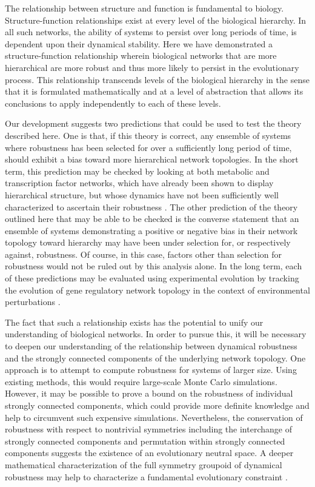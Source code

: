 The relationship between structure and function is fundamental to biology. Structure-function relationships exist at every level of the biological hierarchy. In all such networks, the ability of systems to persist over long periods of time, is dependent upon their dynamical stability. Here we have demonstrated a structure-function relationship wherein biological networks that are more hierarchical are more robust and thus more likely to persist in the evolutionary process. This relationship transcends levels of the biological hierarchy in the sense that it is formulated mathematically and at a level of abstraction that allows its conclusions to apply independently to each of these levels.

Our development suggests two predictions that could be used to test the theory described here. One is that, if this theory is correct, any ensemble of systems where robustness has been selected for over a sufficiently long period of time, should exhibit a bias toward more hierarchical network topologies. In the short term, this prediction may be checked by looking at both metabolic and transcription factor networks, which have already been shown to display hierarchical structure, but whose dynamics have not been sufficiently well characterized to ascertain their robustness \cite{Zhao2006,Bhardwaj2010,Colm}. The other prediction of the theory outlined here that may be able to be checked is the converse statement that an ensemble of systems demonstrating a positive or negative bias in their network topology toward hierarchy may have been under selection for, or respectively against, robustness. Of course, in this case, factors other than selection for robustness would not be ruled out by this analysis alone.  In the long term, each of these predictions may be evaluated using experimental evolution by tracking the evolution of gene regulatory network topology in the context of environmental perturbations \cite{Leroi1994}.

The fact that such a relationship exists has the potential to unify our understanding of biological networks. In order to pursue this, it will be necessary to deepen our understanding of the relationship between dynamical robustness and the strongly connected components of the underlying network topology. One approach is to attempt to compute robustness for systems of larger size. Using existing methods, this would require large-scale Monte Carlo simulations. However, it may be possible to prove a bound on the robustness of individual strongly connected components, which could provide more definite knowledge and help to circumvent such expensive simulations. Nevertheless, the conservation of robustness with respect to nontrivial symmetries including the interchange of strongly connected components and permutation within strongly connected components suggests the existence of an evolutionary neutral space. A deeper mathematical characterization of the full symmetry groupoid of dynamical robustness may help to characterize a fundamental evolutionary constraint \cite{Golubitsky2006}.
